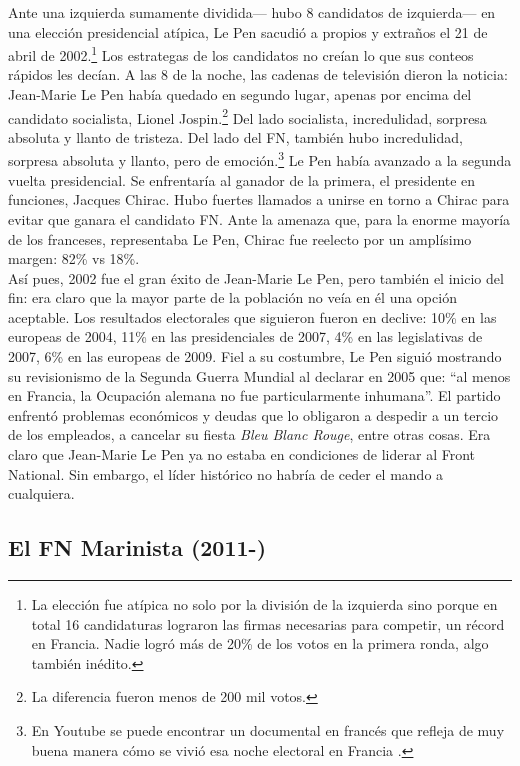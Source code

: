 Ante una izquierda sumamente dividida--- hubo 8 candidatos de izquierda--- en una elección presidencial atípica, Le Pen sacudió a propios y extraños el 21 de abril de 2002.\footnote{La elección fue atípica no solo por la división de la izquierda sino porque en total 16 candidaturas lograron las firmas necesarias para competir, un récord en Francia. Nadie logró más de 20\% de los votos en la primera ronda, algo también inédito.} Los estrategas de los candidatos no creían lo que sus conteos rápidos les decían. A las 8 de la noche, las cadenas de televisión dieron la noticia: Jean-Marie Le Pen había quedado en segundo lugar, apenas por encima del candidato socialista, Lionel Jospin.\footnote{La diferencia fueron menos de 200 mil votos.} Del lado socialista, incredulidad, sorpresa absoluta y llanto de tristeza. Del lado del FN, también hubo incredulidad, sorpresa absoluta y llanto, pero de emoción.\footnote{En Youtube se puede encontrar un documental en francés que refleja de muy buena manera cómo se vivió esa noche electoral en Francia \parencite[por ejemplo, ver desde el min. 30]{Capo17}.} Le Pen había avanzado a la segunda vuelta presidencial. Se enfrentaría al ganador de la primera, el presidente en funciones, Jacques Chirac. Hubo fuertes llamados a unirse en torno a Chirac para evitar que ganara el candidato FN. Ante la amenaza que, para la enorme mayoría de los franceses, representaba Le Pen, Chirac fue reelecto por un amplísimo margen: 82\% vs 18\%. \\

Así pues, 2002 fue el gran éxito de Jean-Marie Le Pen, pero también el inicio del fin: era claro que la mayor parte de la población no veía en él una opción aceptable. Los resultados electorales que siguieron fueron en declive: 10\% en las europeas de 2004, 11\% en las presidenciales de 2007, 4\% en las legislativas de 2007, 6\% en las europeas de 2009. Fiel a su costumbre, Le Pen siguió mostrando su revisionismo de la Segunda Guerra Mundial al declarar en 2005 que: ``al menos en Francia, la Ocupación alemana no fue particularmente inhumana''. El partido enfrentó problemas económicos y deudas que lo obligaron a despedir a un tercio de los empleados, a cancelar su fiesta \textit{Bleu Blanc Rouge}, entre otras cosas. Era claro que Jean-Marie Le Pen ya no estaba en condiciones de liderar al Front National. Sin embargo, el líder histórico no habría de ceder el mando a cualquiera.\\

\subsection{El FN Marinista (2011-)} 
 
